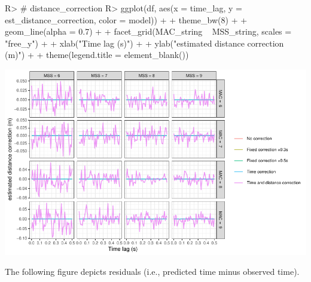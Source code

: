 \documentclass[
]{jss}
\begin{document}
\begin{CodeChunk}
\begin{CodeInput}
R> # distance_correction
R> ggplot(df, aes(x = time_lag, y = est_distance_correction, color = model)) +
+   theme_bw(8) +
+   geom_line(alpha = 0.7) +
+   facet_grid(MAC_string ~ MSS_string, scales = "free_y") +
+   xlab("Time lag (s)") +
+   ylab("estimated distance correction (m)") +
+   theme(legend.title = element_blank())
\end{CodeInput}


\begin{center}\includegraphics[width=1\linewidth]{paper_files/figure-latex/unnamed-chunk-46-1} \end{center}

\end{CodeChunk}

The following figure depicts residuals (i.e., predicted time minus observed time).
\end{document}
